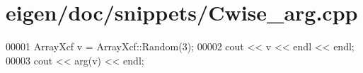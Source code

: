 \hypertarget{eigen_2doc_2snippets_2_cwise__arg_8cpp_source}{}\section{eigen/doc/snippets/\+Cwise\+\_\+arg.cpp}
\label{eigen_2doc_2snippets_2_cwise__arg_8cpp_source}

\begin{DoxyCode}
00001 ArrayXcf v = ArrayXcf::Random(3);
00002 cout << v << endl << endl;
00003 cout << arg(v) << endl;
\end{DoxyCode}
